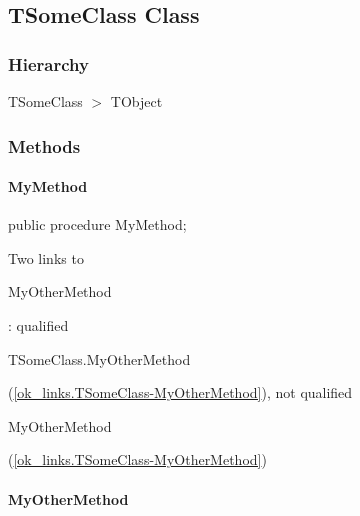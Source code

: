 \documentclass{report}
\begin{document}
\subsection*{TSomeClass Class}
\subsubsection*{\large{\textbf{Hierarchy}}\normalsize\hspace{1ex}\hfill}
TSomeClass {$>$} TObject
\subsubsection*{\large{\textbf{Methods}}\normalsize\hspace{1ex}\hfill}
\paragraph*{MyMethod}\hspace*{\fill}

\begin{list}{}{
\setlength{\itemindent}{0cm}
\setlength{\listparindent}{0cm}
\setlength{\leftmargin}{\evensidemargin}
\addtolength{\leftmargin}{\tmplength}
\settowidth{\labelsep}{X}
\addtolength{\leftmargin}{\labelsep}
\setlength{\labelwidth}{\tmplength}
}
\begin{flushleft}
\item[\textbf{Declaration}\hfill]
\begin{ttfamily}
public procedure MyMethod;\end{ttfamily}


\end{flushleft}
\par
\item[\textbf{Description}]
Two links to \begin{ttfamily}MyOtherMethod\end{ttfamily} : qualified \begin{ttfamily}TSomeClass.MyOtherMethod\end{ttfamily}(\ref{ok_links.TSomeClass-MyOtherMethod}), not qualified \begin{ttfamily}MyOtherMethod\end{ttfamily}(\ref{ok_links.TSomeClass-MyOtherMethod})

\end{list}
\paragraph*{MyOtherMethod}\hspace*{\fill}
\end{document}
